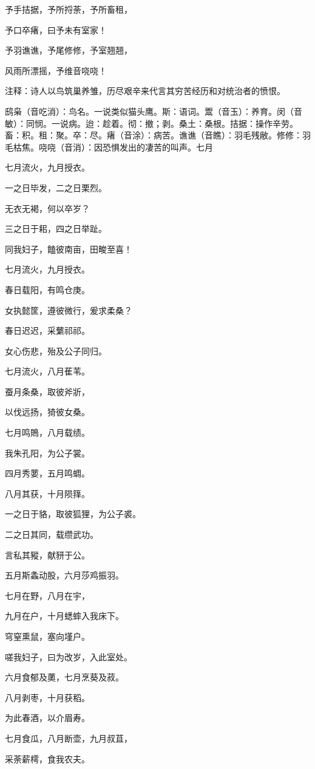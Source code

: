 \documentclass[12pt,UTF8]{ctexbook}
\begin{document}
予手拮据，予所捋荼，予所畜租，

予口卒瘏，曰予未有室家！

予羽谯谯，予尾修修，予室翘翘，

风雨所漂摇，予维音哓哓！

注释：诗人以鸟筑巢养雏，历尽艰辛来代言其穷苦经历和对统治者的愤恨。

鸱枭（音吃消）：鸟名。一说类似猫头鹰。斯：语词。鬻（音玉）：养育。闵（音敏）：同悯。一说病。迨：趁着。彻：撤；剥。桑土：桑根。拮据：操作辛劳。畜：积。租：聚。卒：尽。瘏（音涂）：病苦。谯谯（音瞧）：羽毛残敝。修修：羽毛枯焦。哓哓（音消）：因恐惧发出的凄苦的叫声。七月

七月流火，九月授衣。

一之日毕发，二之日栗烈。

无衣无褐，何以卒岁？

三之日于耜，四之日举趾。

同我妇子，饁彼南亩，田畯至喜！

七月流火，九月授衣。

春日载阳，有鸣仓庚。

女执懿筐，遵彼微行，爰求柔桑？

春日迟迟，采蘩祁祁。

女心伤悲，殆及公子同归。

七月流火，八月萑苇。

蚕月条桑，取彼斧斨，

以伐远扬，猗彼女桑。

七月鸣鵙，八月载绩。

我朱孔阳，为公子裳。

四月秀葽，五月鸣蜩。

八月其获，十月陨箨。

一之日于貉，取彼狐狸，为公子裘。

二之日其同，载缵武功。

言私其豵，献豜于公。

五月斯螽动股，六月莎鸡振羽。

七月在野，八月在宇，

九月在户，十月蟋蟀入我床下。

穹窒熏鼠，塞向墐户。

嗟我妇子，曰为改岁，入此室处。

六月食郁及薁，七月烹葵及菽。

八月剥枣，十月获稻。

为此春酒，以介眉寿。

七月食瓜，八月断壶，九月叔苴，

采荼薪樗，食我农夫。
\end{document}
